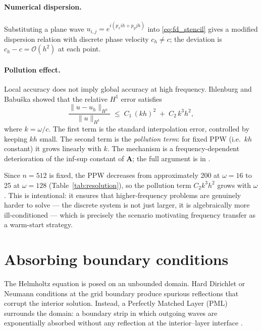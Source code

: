 \paragraph{Numerical dispersion.}
Substituting a plane wave $u_{i,j} = e^{i(p_x ih + p_y jh)}$
into \eqref{eq:fd_stencil} gives a modified dispersion relation
with discrete phase velocity $c_h \neq c$; the deviation is
$c_h - c = \mathcal{O}(h^2)$ at each point.

\paragraph{Pollution effect.}
Local accuracy does not imply global accuracy at high frequency.
Ihlenburg and Babu\v{s}ka \cite{Ihlenburg1995,Ihlenburg1998}
showed that the relative $H^1$ error satisfies
\begin{equation}
    \frac{\|u - u_h\|_{H^1}}{\|u\|_{H^1}}
    \;\leq\;
    C_1\,(kh)^2 \;+\; C_2\,k^3 h^2,
    \label{eq:pollution_bound}
\end{equation}
where $k = \omega/c$. The first term is the standard
interpolation error, controlled by keeping $kh$ small. The
second term is the \emph{pollution term}: for fixed PPW (i.e.\
$kh$ constant) it grows linearly with $k$. The mechanism is a
frequency-dependent deterioration of the inf-sup constant of
$\mathbf{A}$; the full argument is in \cite{Ihlenburg1998}.

Since $n = 512$ is fixed, the PPW decreases from approximately
200 at $\omega = 16$ to 25 at $\omega = 128$
(Table~\ref{tab:resolution}), so the pollution term $C_2 k^3 h^2$
grows with $\omega$. This is intentional: it ensures that
higher-frequency problems are genuinely harder to solve --- the
discrete system is not just larger, it is algebraically more
ill-conditioned --- which is precisely the scenario motivating
frequency transfer as a warm-start strategy.



\section{Absorbing boundary conditions}
\label{sec:pml_discretisation}

The Helmholtz equation is posed on an unbounded domain. Hard
Dirichlet or Neumann conditions at the grid boundary produce
spurious reflections that corrupt the interior solution. Instead,
a Perfectly Matched Layer (PML) surrounds the domain: a boundary
strip in which outgoing waves are exponentially absorbed without
any reflection at the interior--layer interface
\cite{Berenger1994,ChewWeedon1994}.

